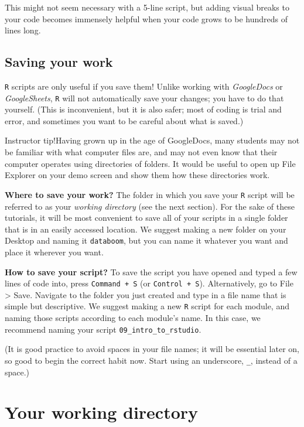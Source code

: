 \documentclass[
]{book}
\begin{document}
This might not seem necessary with a 5-line script, but adding visual breaks to your code becomes immensely helpful when your code grows to be hundreds of lines long.

\hypertarget{saving-your-work}{%
\subsection*{Saving your work}\label{saving-your-work}}

\texttt{R} scripts are only useful if you save them! Unlike working with \emph{GoogleDocs} or \emph{GoogleSheets}, \texttt{R} will not automatically save your changes; you have to do that yourself. (This is inconvenient, but it is also safer; most of coding is trial and error, and sometimes you want to be careful about what is saved.)

Instructor tip!Having grown up in the age of GoogleDocs, many students may not be familiar with what computer files are, and may not even know that their computer operates using directories of folders. It would be useful to open up File Explorer on your demo screen and show them how these directories work.

\textbf{Where to save your work?} The folder in which you save your \texttt{R} script will be referred to as your \emph{working directory} (see the next section). For the sake of these tutorials, it will be most convenient to save all of your scripts in a single folder that is in an easily accessed location. We suggest making a new folder on your Desktop and naming it \texttt{databoom}, but you can name it whatever you want and place it wherever you want.

\textbf{How to save your script?} To save the script you have opened and typed a few lines of code into, press \texttt{Command\ +\ S} (or \texttt{Control\ +\ S}). Alternatively, go to File \textgreater{} Save. Navigate to the folder you just created and type in a file name that is simple but descriptive. We suggest making a new \texttt{R} script for each module, and naming those scripts according to each module's name. In this case, we recommend naming your script \texttt{09\_intro\_to\_rstudio}.

(It is good practice to avoid spaces in your file names; it will be essential later on, so good to begin the correct habit now. Start using an underscore, \texttt{\_}, instead of a space.)

\hypertarget{your-working-directory}{%
\section*{Your working directory}\label{your-working-directory}}
\end{document}
